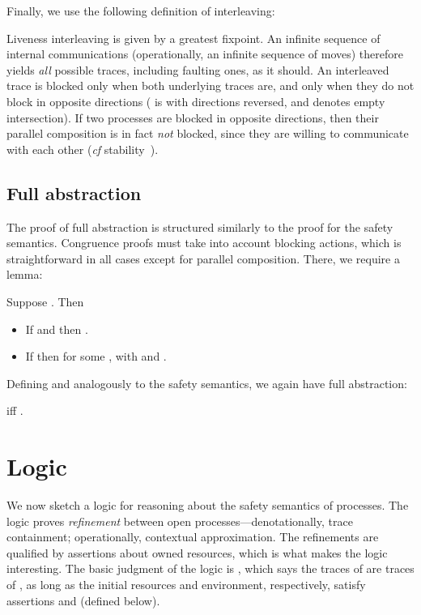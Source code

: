 \documentclass{entcs}
\begin{document}
Finally, we use the following definition of interleaving:

Liveness interleaving is given by a greatest fixpoint.  An infinite
sequence of internal communications (operationally, an infinite
sequence of  moves) therefore yields \emph{all} possible traces,
including faulting ones, as it should.  An interleaved trace is
blocked only when both underlying traces are, and only when they do
not block in opposite directions ( is  with
directions reversed, and  denotes empty intersection).  If
two processes are blocked in opposite directions, then their parallel
composition is in fact \emph{not} blocked, since they are willing to
communicate with each other (\emph{cf} stability~\cite{Brookes1984}).

\subsection{Full abstraction}

The proof of full abstraction is structured similarly to the proof for
the safety semantics.  Congruence proofs must take into account
blocking actions, which is straightforward in all cases except for
parallel composition.  There, we require a lemma:

\begin{lemma}
Suppose .  Then
\begin{itemize}
\item If  and  then .
\item If  then
   for some ,
   with  and
  .
\end{itemize}
\end{lemma}

Defining  and  analogously to the
safety semantics, we again have full abstraction:
\begin{theorem}
   iff .
\end{theorem}

\section{Logic}
\label{sec:logic}

We now sketch a logic for reasoning about the safety semantics of
processes.  The logic proves \emph{refinement} between open
processes---denotationally, trace containment; operationally,
contextual approximation.  The refinements are qualified by assertions
about owned resources, which is what makes the logic interesting.  The
basic judgment of the logic is ,
which says the traces of  are traces of , as long as the initial
resources and environment, respectively, satisfy assertions  and  (defined below).
\end{document}
